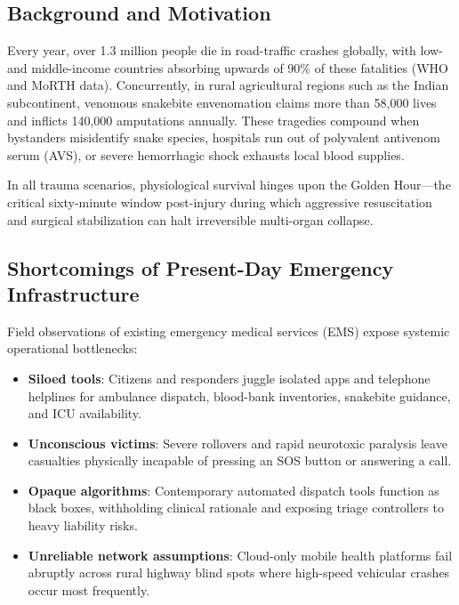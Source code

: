 \documentclass[conference]{IEEEtran}
\begin{document}
\subsection{Background and Motivation}
Every year, over 1.3 million people die in road-traffic crashes globally, with low- and middle-income countries absorbing upwards of 90\% of these fatalities (WHO and MoRTH data). Concurrently, in rural agricultural regions such as the Indian subcontinent, venomous snakebite envenomation claims more than 58,000 lives and inflicts 140,000 amputations annually. These tragedies compound when bystanders misidentify snake species, hospitals run out of polyvalent antivenom serum (AVS), or severe hemorrhagic shock exhausts local blood supplies.

In all trauma scenarios, physiological survival hinges upon the Golden Hour---the critical sixty-minute window post-injury during which aggressive resuscitation and surgical stabilization can halt irreversible multi-organ collapse.

\subsection{Shortcomings of Present-Day Emergency Infrastructure}
Field observations of existing emergency medical services (EMS) expose systemic operational bottlenecks:
\begin{itemize}
    \item \textbf{Siloed tools}: Citizens and responders juggle isolated apps and telephone helplines for ambulance dispatch, blood-bank inventories, snakebite guidance, and ICU availability.
    \item \textbf{Unconscious victims}: Severe rollovers and rapid neurotoxic paralysis leave casualties physically incapable of pressing an SOS button or answering a call.
    \item \textbf{Opaque algorithms}: Contemporary automated dispatch tools function as black boxes, withholding clinical rationale and exposing triage controllers to heavy liability risks.
    \item \textbf{Unreliable network assumptions}: Cloud-only mobile health platforms fail abruptly across rural highway blind spots where high-speed vehicular crashes occur most frequently.
\end{itemize}
\end{document}
